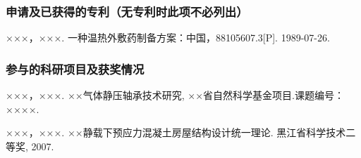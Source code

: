 \begin{appendixenv}
    \subsubsection{申请及已获得的专利（无专利时此项不必列出）}
    \begin{achievements}
        \item ×××，×××. 一种温热外敷药制备方案：中国，88105607.3[P]. 1989-07-26.
    \end{achievements}
    
    \subsubsection{参与的科研项目及获奖情况}
    
    \begin{achievements}
        \item ×××，×××. ××气体静压轴承技术研究, ××省自然科学基金项目.课题编号：××××.
        \item ×××，×××. ××静载下预应力混凝土房屋结构设计统一理论. 黑江省科学技术二等奖, 2007.
    \end{achievements}
\end{appendixenv}